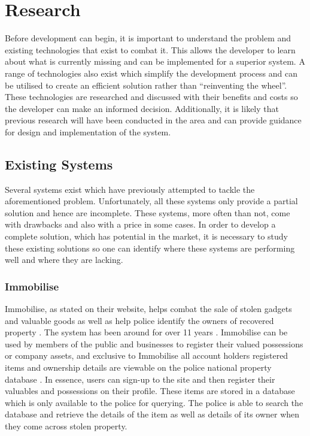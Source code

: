 \section{Research}\label{Section:Research}
Before development can begin, it is important to understand the problem and existing technologies that exist to combat it. This allows the developer to learn about what is currently missing and can be implemented for a superior system. A range of technologies also exist which simplify the development process and can be utilised to create an efficient solution rather than ``reinventing the wheel''. These technologies are researched and discussed with their benefits and costs so the developer can make an informed decision. Additionally, it is likely that previous research will have been conducted in the area and can provide guidance for design and implementation of the system.

\subsection{Existing Systems}
Several systems exist which have previously attempted to tackle the aforementioned problem. Unfortunately, all these systems only provide a partial solution and hence are incomplete. These systems, more often than not, come with drawbacks and also with a price in some cases. In order to develop a complete solution, which has potential in the market, it is necessary to study these existing solutions so one can identify where these systems are performing well and where they are lacking.

\subsubsection{Immobilise}
Immobilise, as stated on their website, helps combat the sale of stolen gadgets and valuable goods as well as help police identify the owners of recovered property \cite{Immobilise:Home}. The system has been around for over 11 years \cite{Immobilise:Home}. Immobilise can be used by members of the public and businesses to register their valued possessions or company assets, and exclusive to Immobilise all account holders registered items and ownership details are viewable on the police national property database \cite{Immobilise:Home}. In essence, users can sign-up to the site and then register their valuables and possessions on their profile. These items are stored in a database which is only available to the police for querying. The police is able to search the database and retrieve the details of the item as well as details of its owner when they come across stolen property. 

